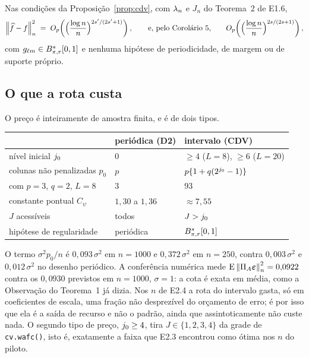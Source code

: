 \documentclass[11pt,a4paper]{article}
\newcommand{\Amat}{A}
\newcommand{\PA}{\Pi_{\Amat}}
\newcommand{\bveps}{\boldsymbol{\varepsilon}}
\newcommand{\pzero}{p_{0}}
\begin{document}
\begin{corollary}\label{cor:taxa-cdv}
Nas condições da Proposição~\ref{prop:cdv}, com
$\lambda_{n}$ e $J_{n}$ do Teorema~2 de E1.6,
\[
  \left\lVert \widehat f - f \right\rVert_{n}^{2}
  \;=\; O_{p}\!\left(\Bigl(\frac{\log n}{n}\Bigr)^{2s'/(2s'+1)}\right),
  \qquad\text{e, pelo Corolário~5,}\qquad
  O_{p}\!\left(\Bigl(\frac{\log n}{n}\Bigr)^{2s/(2s+1)}\right),
\]
com $g_{\ell m}\in B^{s}_{\pi,r}[0,1]$ e nenhuma hipótese de
periodicidade, de margem ou de suporte próprio.
\end{corollary}

\subsection*{O que a rota custa}

O preço é inteiramente de amostra finita, e é de dois tipos.

\begin{center}
\begin{tabular}{lll}
  \toprule
  & periódica (D2) & intervalo (CDV) \\
  \midrule
  nível inicial $j_{0}$ & $0$ & $\ge 4$ ($L=8$), $\ge 6$ ($L=20$) \\
  colunas não penalizadas $\pzero$ & $p$ & $p\{1+q(2^{j_{0}}-1)\}$ \\
  \quad com $p=3$, $q=2$, $L=8$ & $3$ & $93$ \\
  constante pontual $C_{\psi}$ & $1{,}30$ a $1{,}36$ & $\approx 7{,}55$ \\
  $J$ acessíveis & todos & $J > j_{0}$ \\
  hipótese de regularidade & periódica & $B^{s}_{\pi,r}[0,1]$ \\
  \bottomrule
\end{tabular}
\end{center}

O termo $\sigma^{2}\pzero/n$ é $0{,}093\,\sigma^{2}$ em $n = 1000$ e
$0{,}372\,\sigma^{2}$ em $n = 250$, contra $0{,}003\,\sigma^{2}$ e
$0{,}012\,\sigma^{2}$ no desenho periódico. A conferência numérica mede
$\E\normn{\PA\bveps}^{2} = 0{,}0922$ contra os $0{,}0930$ previstos em
$n = 1000$, $\sigma = 1$: a cota é exata em média, como a Observação do
Teorema~1 já dizia. Nos $n$ de E2.4 a rota do intervalo gasta, só em
coeficientes de escala, uma fração não desprezível do orçamento de erro; é
por isso que ela é a saída de recurso e não o padrão, ainda que
assintoticamente não custe nada. O segundo tipo de preço, $j_{0} \ge 4$,
tira $J \in \{1,2,3,4\}$ da grade de \texttt{cv.wafc()}, isto é, exatamente
a faixa que E2.3 encontrou como ótima nos $n$ do piloto.
\end{document}
